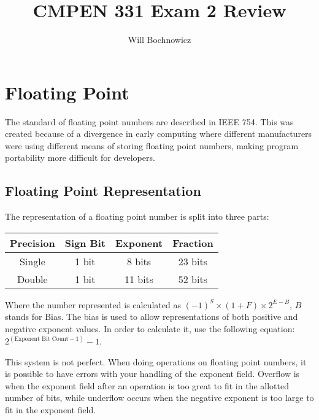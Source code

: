 \documentclass{article}
\title{CMPEN 331 Exam 2 Review}
\author{Will Bochnowicz}
\begin{document}
\maketitle

\tableofcontents

\section{Floating Point}\label{Floating Point}

The standard of floating point numbers are described in IEEE 754. This was created because of a divergence in early computing where different manufacturers were using different means of storing floating point numbers, making program portability more difficult for developers. 

\subsection{Floating Point Representation}
The representation of a floating point number is split into three parts:

\begin{tabular}{|c|c|c|c|}
    \hline
     Precision & Sign Bit & Exponent & Fraction \\
     \hline
     Single & 1 bit & 8 bits & 23 bits \\
     \hline
     Double & 1 bit & 11 bits & 52 bits \\
     \hline
\end{tabular}

Where the number represented is calculated as $(-1)^S \times (1 + F) \times 2^{E-B}$, $B$ stands for Bias. The bias  is used to allow representations of both positive and negative exponent values. In order to calculate it, use the following equation: $2^{(\text{Exponent Bit Count}-1)}-1$.

This system is not perfect. When doing operations on floating point numbers, it is possible to have errors with your handling of the exponent field. Overflow is when the exponent field after an operation is too great to fit in the allotted number of bits, while underflow occurs when the negative exponent is too large to fit in the exponent field. 
\end{document}

